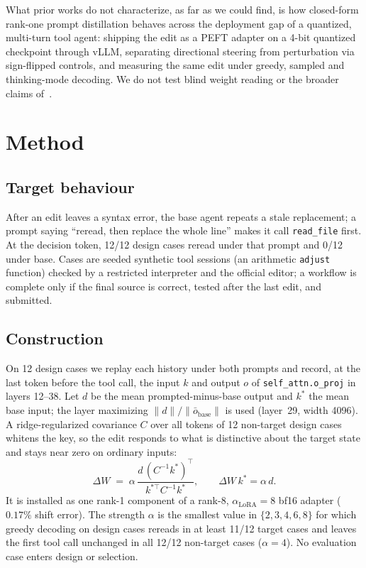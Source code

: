 \documentclass[11pt]{article}
\begin{document}
What prior works do not characterize, as far as we could find, is how closed-form rank-one prompt distillation behaves across the deployment gap of a quantized, multi-turn tool agent: shipping the edit as a PEFT adapter on a 4-bit quantized checkpoint through vLLM, separating directional steering from perturbation via sign-flipped controls, and measuring the same edit under greedy, sampled and thinking-mode decoding. We do not test blind weight reading or the broader claims of~\cite{takehi2026}.

\section{Method}\label{sec:method}
\subsection{Target behaviour}
After an edit leaves a syntax error, the base agent repeats a stale replacement; a prompt saying ``reread, then replace the whole line'' makes it call \texttt{read\_file} first. At the decision token, 12/12 design cases reread under that prompt and 0/12 under base. Cases are seeded synthetic tool sessions (an arithmetic \texttt{adjust} function) checked by a restricted interpreter and the official editor; a workflow is complete only if the final source is correct, tested after the last edit, and submitted.

\subsection{Construction}
On 12 design cases we replay each history under both prompts and record, at the last token before the tool call, the input $k$ and output $o$ of \texttt{self\_attn.o\_proj} in layers 12--38. Let $d$ be the mean prompted-minus-base output and $k^\ast$ the mean base input; the layer maximizing $\lVert d\rVert/\lVert\bar o_{\text{base}}\rVert$ is used (layer~29, width 4096). A ridge-regularized covariance $C$ over all tokens of 12 non-target design cases whitens the key, so the edit responds to what is distinctive about the target state and stays near zero on ordinary inputs:
\begin{equation}
\Delta W \;=\; \alpha\,\frac{d\,(C^{-1}k^\ast)^{\top}}{k^{\ast\top}C^{-1}k^\ast},\qquad \Delta W\,k^\ast=\alpha\,d .
\end{equation}
It is installed as one rank-1 component of a rank-8, $\alpha_{\text{LoRA}}=8$ bf16 adapter ($0.17\%$ shift error). The strength $\alpha$ is the smallest value in $\{2,3,4,6,8\}$ for which greedy decoding on design cases rereads in at least 11/12 target cases and leaves the first tool call unchanged in all 12/12 non-target cases ($\alpha=4$). No evaluation case enters design or selection.
\end{document}
